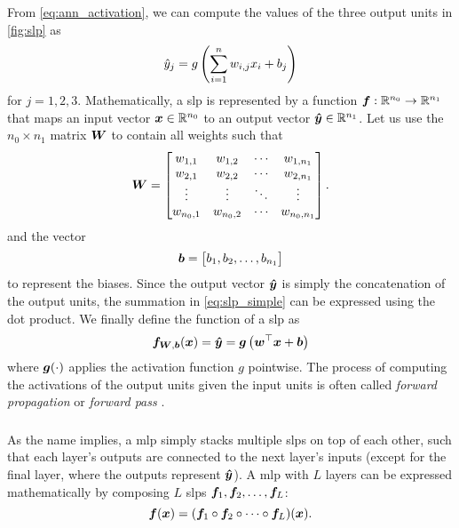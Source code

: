 \documentclass[../report.tex]{subfiles}
\begin{document}
From \cref{eq:ann_activation}, we can compute the values of the three output units in \cref{fig:slp} as
\begin{equation}
    \label{eq:slp_simple}
    \hat{y}_j = g\left(\sum_{i=1}^n{w_{i,j} x_i} + b_j\right)
\end{equation}
for $j=1,2,3$.
Mathematically, a \gls{slp} is represented by a function ${\bm{f}}:\mathbb{R}^{n_0}\to \mathbb{R}^{n_1}$ that maps an input vector ${\bm{x}} \in \mathbb{R}^{n_0}$ to an output vector ${\bm{\hat{y}}} \in \mathbb{R}^{n_1}$.
Let us use the $n_0 \times n_1$ matrix ${\bm{W}}$ to contain all weights such that
\begin{equation*}
    {\bm{W}} = \begin{bmatrix}
        w_{1,1} & w_{1,2} & \cdots & w_{1,n_1} \\ 
        w_{2,1} & w_{2,2} & \cdots & w_{2,n_1} \\ 
        \vdots & \vdots & \ddots & \vdots \\ 
        w_{n_0,1} & w_{n_0,2} & \cdots & w_{n_0,n_1} \\ 
    \end{bmatrix}.
\end{equation*}
and the vector
\begin{equation*}
    {\bm{b}} = \begin{bmatrix}
        b_1,b_2,\dots,b_{n_1}
    \end{bmatrix}
\end{equation*}
to represent the biases.
Since the output vector ${\bm{\hat{y}}}$ is simply the concatenation of the output units, the summation in \cref{eq:slp_simple} can be expressed using the dot product. We finally define the function of a \gls{slp} as
\begin{equation}
    \label{eq:slp}
    {\bm{f}}_{{\bm{W}},{\bm{b}}}({\bm{x}}) = {\bm{\hat{y}}} = {\bm{g}}\left(
        {\bm{w}}^\top {\bm{x}} + {\bm{b}}
    \right)
\end{equation}
where ${\bm{g}}(\cdot)$ applies the activation function $g$ pointwise.
The process of computing the activations of the output units given the input units is often called \emph{forward propagation} or \emph{forward pass} \cite{burkov2019}.

\subsubsection{}
As the name implies, a \gls{mlp} simply stacks multiple \glspl{slp} on top of each other, such that each layer's outputs are connected to the next layer's inputs (except for the final layer, where the outputs represent ${\bm{\hat{y}}}$).
A \gls{mlp} with $L$ layers can be expressed mathematically by composing $L$ \glspl{slp} ${\bm{f}}_1,{\bm{f}}_2,\dots,{\bm{f}}_L$:
\begin{equation}
    \label{eq:mlp}
    {\bm{f}}({\bm{x}}) = ({\bm{f}}_1 \circ {\bm{f}}_2 \circ \dots \circ {\bm{f}}_L)({\bm{x}}).
\end{equation}
\end{document}
